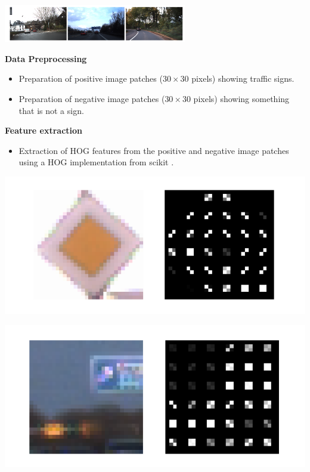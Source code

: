 \documentclass[a0paper,portrait]{baposter}
\begin{document}
\begin{poster}
{\begin{center}
\includegraphics[width=0.6\textwidth]{ex_imgs_small.png}
\end{center}

}
 



{
\textbf{Data Preprocessing}
\begin{itemize}
	\setlength\itemsep{0em}
	\item Preparation of positive image patches ($30 \times 30$ pixels) showing traffic signs.
	\item Preparation of negative image patches ($30 \times 30$ pixels) showing something that is not a sign. 
\end{itemize}

\textbf{Feature extraction}
\begin{itemize}
	\setlength\itemsep{0em}
	\item Extraction of HOG features from the positive and negative image patches using a HOG implementation from scikit \cite{scikithog}.
\end{itemize}


\begin{minipage}{0.48\textwidth}
\centering
\includegraphics[width=0.7\linewidth]{hog_pos2_small.png}
\end{minipage}
\hfill
\begin{minipage}{0.48\textwidth}
\centering
\includegraphics[width=0.7\linewidth]{hog_neg_small.png}
\end{minipage}


}
\end{poster}
\end{document}

